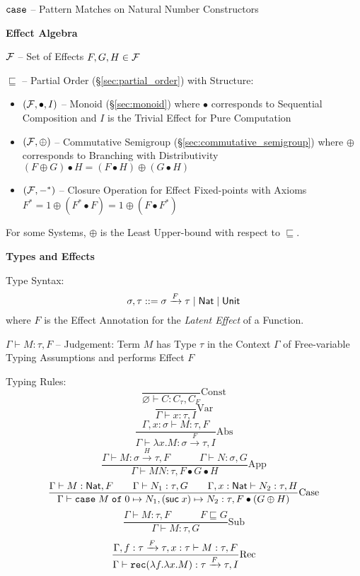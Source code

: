 $\mathtt{case}$ -- Pattern Matches on Natural Number Constructors


\textbf{Effect Algebra}

$\mathcal{F}$ -- Set of Effects $F,G,H \in \mathcal{F}$

$\sqsubseteq$ -- Partial Order (\S\ref{sec:partial_order}) with
Structure:
\begin{itemize}
  \item $(\mathcal{F},\bullet,I)$ -- Monoid (\S\ref{sec:monoid}) where
    $\bullet$ corresponds to Sequential Composition and $I$ is the
    Trivial Effect for Pure Computation
  \item $(\mathcal{F},\oplus)$ -- Commutative Semigroup
    (\S\ref{sec:commutative_semigroup}) where $\oplus$ corresponds to
    Branching with Distributivity $(F \oplus G) \bullet H = (F \bullet
    H) \oplus (G \bullet H)$
  \item $(\mathcal{F},-^*)$ -- Closure Operation for Effect Fixed-points
    with Axioms $F^* = 1 \oplus (F^* \bullet F) = 1 \oplus (F \bullet
    F^*)$
\end{itemize}
For some Systems, $\oplus$ is the Least Upper-bound with respect to
$\sqsubseteq$. %


\textbf{Types and Effects}

Type Syntax:
\[
  \sigma,\tau ::= \sigma \xrightarrow{F} \tau \mid \mathsf{Nat} \mid \mathsf{Unit}
\]
where $F$ is the Effect Annotation for the \emph{Latent Effect} of a
Function. %

$\Gamma \vdash M:\tau,F$ -- Judgement: Term $M$ has Type $\tau$ in the
Context $\Gamma$ of Free-variable Typing Assumptions and performs
Effect $F$

Typing Rules:
\[
  \frac{}{\varnothing \vdash C : C_\tau,C_F} \mathrm{Const}
\]\[
  \frac{}{\Gamma \vdash x:\tau,I} \mathrm{Var}
\]\[
  \frac{\Gamma, x:\sigma \vdash M:\tau,F}
  {\Gamma \vdash \lambda x.M:\sigma \xrightarrow{F} \tau,I}
  \mathrm{Abs}
\]\[
  \frac{\Gamma \vdash M:\sigma \xrightarrow{H} \tau,F
    \quad\quad\quad \Gamma \vdash N:\sigma,G}
  {\Gamma \vdash M N:\tau, F \bullet G \bullet H}
  \mathrm{App}
\]\[
  \frac{\Gamma \vdash M:\mathsf{Nat},F \quad\quad
    \Gamma \vdash N_1:\tau,G \quad\quad
    \Gamma,x:\mathsf{Nat} \vdash N_2:\tau,H}
  {\Gamma \vdash \mathtt{case}\; M \;\mathtt{of}\; 0 \mapsto N_1,
    (\mathsf{suc}\;x) \mapsto N_2:\tau, F \bullet(G \oplus H)}
  \mathrm{Case}
\]\[
  \frac{\Gamma \vdash M:\tau,F \quad\quad\quad F \sqsubseteq G}
  {\Gamma \vdash M:\tau,G} \mathrm{Sub}
\]\[
  \frac{\Gamma, f:\tau \xrightarrow{F} \tau, x:\tau \vdash M:\tau,F}
  {\Gamma \vdash
    \mathtt{rec}(\lambda f.\lambda x.M):\tau \xrightarrow{F} \tau,I}
  \mathrm{Rec}
\]

